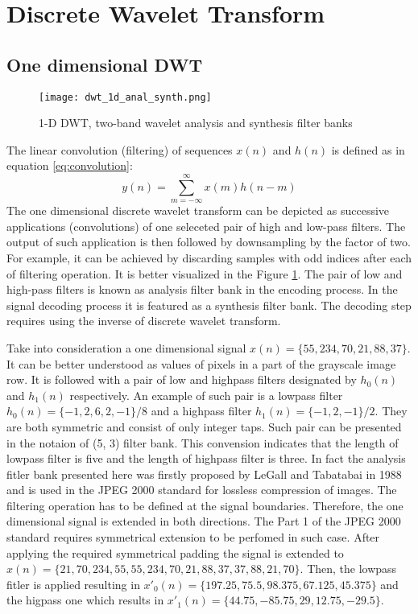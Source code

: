 \section{Discrete Wavelet Transform}

\subsection{One dimensional DWT}

\begin{figure}
    \centering
    \texttt{[image: dwt\_1d\_anal\_synth.png]}
    \caption{1-D DWT, two-band wavelet analysis and synthesis filter banks \cite{jpeg_suite}}
    \label{fig:dwt_1d_anal_synth}
\end{figure}

The linear convolution (filtering) of sequences $x(n)$ and $h(n)$ is defined as in equation \ref{eq:convolution}:
\begin{equation}
    y(n)=\sum_{m=-\infty}^{\infty}x(m)h(n-m)
\label{eq:convolution}
\end{equation}
The one dimensional discrete wavelet transform can be depicted as successive applications (convolutions) of
one seleceted pair of high and low-pass filters. The output of such application is then followed
by downsampling by the factor of two. For example, it can be achieved by discarding samples with
odd indices after each of filtering operation. It is better visualized in the Figure \ref{fig:dwt_1d_anal_synth}. \cite{jpeg_suite} 
The pair of low and high-pass filters is known as analysis filter bank in the encoding process.
In the signal decoding process it is featured as a synthesis filter bank. The decoding step requires
using the inverse of discrete wavelet transform. 

Take into consideration a one dimensional signal $x(n) = \{55, 234, 70, 21, 88, 37\}$. It can be better
understood as values of pixels in a part of the grayscale image row. It is followed with a pair of low
and highpass filters designated by $h_{0}(n)$ and $h_{1}(n)$ respectively. An example of such pair is
a lowpass filter $h_{0}(n) = \{-1, 2, 6, 2, -1\}/8$ and a highpass filter $h_{1}(n) = \{-1, 2, -1\}/2$. They are both
symmetric and consist of only integer taps. Such pair can be presented in the notaion of (5, 3) filter bank.
This convension indicates that the length of lowpass filter is five and the length of highpass filter is three.
In fact the analysis fitler bank presented here was firstly proposed by LeGall and Tabatabai in 1988 and
is used in the JPEG 2000 standard for lossless compression of images. The filtering operation has to
be defined at the signal boundaries. Therefore, the one dimensional signal is extended in both directions.
The Part 1 of the JPEG 2000 standard requires symmetrical extension to be perfomed in such case. \cite{jpeg_suite}
After applying the required symmetrical padding the signal is extended to
$x(n) = \{21, 70, 234, 55, 55, 234, 70, 21, 88, 37, 37, 88, 21, 70\}$. Then, the lowpass fitler is applied
resulting in $x'_{0}(n) = \{197.25, 75.5, 98.375, 67.125, 45.375\}$ and the higpass one which results in
$x'_{1}(n) = \{44.75, -85.75, 29, 12.75, -29.5\}$.

